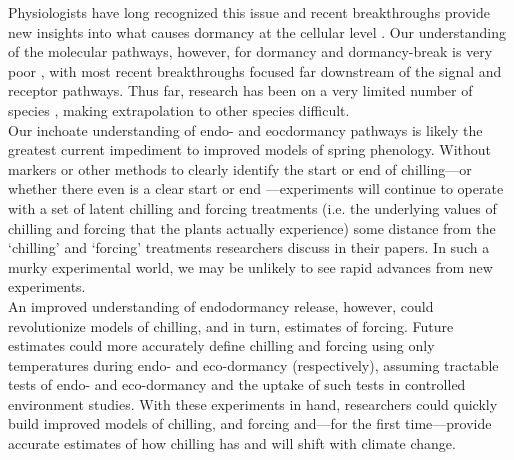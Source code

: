\documentclass[11pt,letter]{article}
\begin{document}
Physiologists have long recognized this issue and recent breakthroughs provide new insights into what causes dormancy at the cellular level \citep{vanderschoot2014}. Our understanding of the molecular pathways, however, for dormancy and dormancy-break is very poor \citep[especially when compared to our understanding of flowering time pathways,][]{Azeez2021}, with most recent breakthroughs  focused far downstream of the signal and receptor pathways. Thus far, research has been on a very limited number of species \citep{Singh:2017,rinne2018}, making extrapolation to other species difficult. \\ %

Our inchoate understanding of endo- and eocdormancy pathways is likely the greatest current impediment to improved models of spring phenology. Without markers or other methods to clearly identify the start or end of chilling---or whether there even is a clear start or end \citep[as opposed to potential parallel models of chilling and forcing,][]{harrington2015}---experiments will continue to operate with a set of latent chilling and forcing treatments (i.e. the underlying values of chilling and forcing that the plants actually experience) some distance from the `chilling' and `forcing' treatments researchers discuss in their papers. In such a murky experimental world, we may be unlikely to see rapid advances from new experiments. \\

An improved understanding of endodormancy release, however, could revolutionize models of chilling, and in turn, estimates of forcing. Future estimates could more accurately define chilling and forcing using only temperatures during endo- and eco-dormancy (respectively), assuming tractable tests of endo- and eco-dormancy and the uptake of such tests in controlled environment studies. With these experiments in hand, researchers could quickly build improved models of chilling, and forcing and---for the first time---provide accurate estimates of how chilling has and will shift with climate change.\\ %
\end{document}
